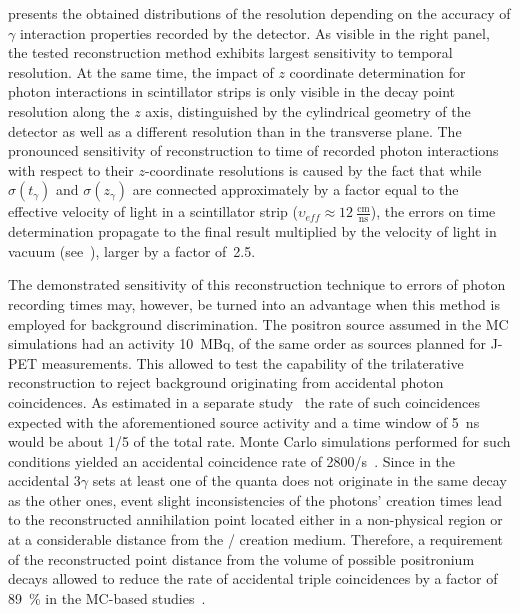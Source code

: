  presents the obtained distributions of the resolution depending on the accuracy of $\gamma$ interaction properties recorded by the detector. As visible in the right panel, the tested reconstruction method exhibits largest sensitivity to temporal resolution.
%
At the same time, the impact of $z$ coordinate determination for photon interactions in scintillator strips is only visible in the decay point resolution along the $z$ axis, distinguished by the cylindrical geometry of the detector as well as a different resolution than in the transverse plane.
%
The pronounced sensitivity of reconstruction to time of recorded photon interactions with respect to their $z$-coordinate resolutions is caused by the fact that while $\sigma(t_{\gamma})$ and $\sigma(z_{\gamma})$ are connected approximately by a factor equal to the effective velocity of light in a scintillator strip ($\upsilon_{eff}\approx 12\:\frac{\text{cm}}{\text{ns}}$), the errors on time determination propagate to the final result multiplied by the velocity of light in vacuum (see~), larger by a factor of~2.5.
%
%

The demonstrated sensitivity of this reconstruction technique to errors of photon recording times may, however, be turned into an advantage when this method is employed for background discrimination.
The positron source assumed in the MC simulations had an activity 10~MBq, of the same order as sources planned for J-PET measurements. This allowed to test the capability of the trilaterative reconstruction to reject background originating from accidental photon coincidences. As estimated in a separate study~\cite{kowalski_scatter_fraction}
the rate of such coincidences expected with the aforementioned source activity and a time window of 5~ns would be about 1/5 of the total rate. Monte Carlo simulations performed for such conditions yielded an accidental coincidence rate of 2800/s~\cite{gajos_gps}. Since in the accidental $3\gamma$ sets at least one of the quanta does not originate in the same decay as the other ones, event slight inconsistencies of the photons' creation times lead to the reconstructed annihilation point located either in a non-physical region or at a considerable distance from the \ops/ creation medium. Therefore, a requirement of the reconstructed point distance from the volume of possible positronium decays allowed to reduce the rate of accidental triple coincidences by a factor of \SI{89}{\percent} in the MC-based studies~\cite{gajos_gps}.

